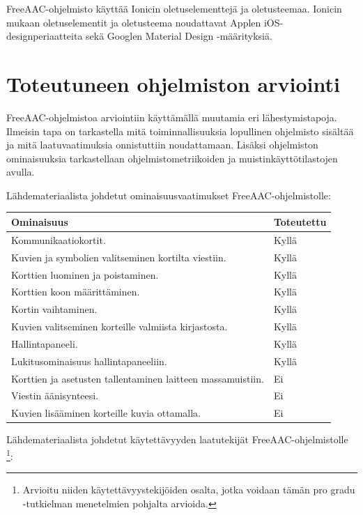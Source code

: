 \documentclass[utf8]{gradu3}
\begin{document}
FreeAAC-ohjelmisto käyttää Ionicin oletuselementtejä ja oletusteemaa. Ionicin mukaan oletuselementit ja oletusteema noudattavat Applen iOS-designperiaatteita sekä Googlen Material Design -määrityksiä.

\chapter{Toteutuneen ohjelmiston arviointi}

FreeAAC-ohjelmistoa arviointiin käyttämällä muutamia eri lähestymistapoja. Ilmeisin tapa on tarkastella mitä toiminnallisuuksia lopullinen ohjelmisto sisältää ja mitä laatuvaatimuksia onnistuttiin noudattamaan. Lisäksi ohjelmiston ominaisuuksia tarkastellaan ohjelmistometriikoiden ja muistinkäyttötilastojen avulla.

Lähdemateriaalista johdetut ominaisuusvaatimukset FreeAAC-ohjelmistolle:

\begin{center}
    \begin{tabular}{ | l | l |}
    \hline
    \textbf{Ominaisuus} & \textbf{Toteutettu} \\ \hline
    Kommunikaatiokortit. & Kyllä \\ \hline
    Kuvien ja symbolien valitseminen kortilta viestiin. & Kyllä \\ \hline
    Korttien luominen ja poistaminen. & Kyllä \\ \hline
    Korttien koon määrittäminen. & Kyllä \\ \hline
    Kortin vaihtaminen. & Kyllä \\ \hline
    Kuvien valitseminen korteille valmiista kirjastosta. & Kyllä \\ \hline
    Hallintapaneeli. & Kyllä \\ \hline
    Lukitusominaisuus hallintapaneeliin. & Kyllä \\ \hline
    Korttien ja asetusten tallentaminen laitteen massamuistiin. & Ei \\ \hline
    Viestin äänisynteesi. & Ei \\ \hline
    Kuvien lisääminen korteille kuvia ottamalla. & Ei \\ \hline
    \end{tabular}
\end{center}

\newpage
Lähdemateriaalista johdetut käytettävyyden laatutekijät FreeAAC-ohjelmistolle \footnote{Arvioitu niiden käytettävyystekijöiden osalta, jotka voidaan tämän pro gradu -tutkielman menetelmien pohjalta arvioida.}:
\end{document}
